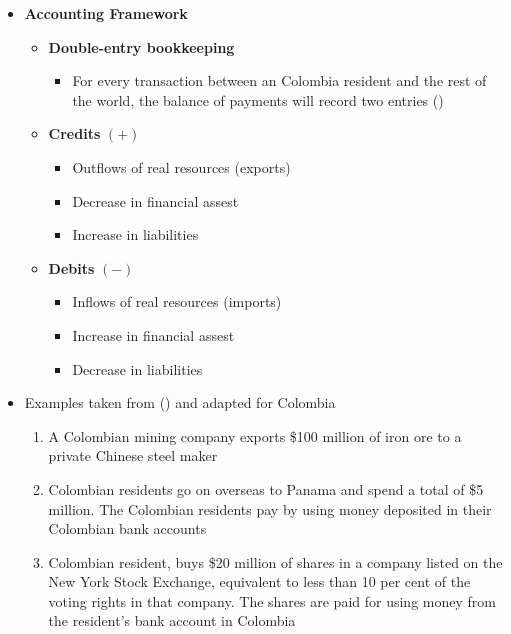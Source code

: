 \documentclass[
  ignorenonframetext,
]{beamer}
\providecommand{\tightlist}{%
  \setlength{\itemsep}{0pt}\setlength{\parskip}{0pt}}\usepackage{longtable,booktabs,array}
\begin{document}
\begin{frame}{}
\label{section-16}
\begin{itemize}
\item
  \textbf{Accounting Framework}

  \begin{itemize}
  \item
    \textbf{Double-entry bookkeeping}

    \begin{itemize}
    \tightlist
    \item
      For every transaction between an Colombia resident and the rest of
      the world, the balance of payments will record two entries
      ()
    \end{itemize}
  \item
    \textbf{Credits} \((+)\)

    \begin{itemize}
    \tightlist
    \item
      Outflows of real resources (exports)
    \item
      Decrease in financial assest
    \item
      Increase in liabilities
    \end{itemize}
  \item
    \textbf{Debits} \((-)\)

    \begin{itemize}
    \tightlist
    \item
      Inflows of real resources (imports)
    \item
      Increase in financial assest
    \item
      Decrease in liabilities
    \end{itemize}
  \end{itemize}
\end{itemize}
\end{frame}

\begin{frame}{}
\label{section-17}
\begin{itemize}
\item
  Examples taken from () and
  adapted for Colombia

  \begin{enumerate}
  \item
    A Colombian mining company exports \$100 million of iron ore to a
    private Chinese steel maker
  \item
    Colombian residents go on overseas to Panama and spend a total of
    \$5 million. The Colombian residents pay by using money deposited in
    their Colombian bank accounts
  \item
    Colombian resident, buys \$20 million of shares in a company listed
    on the New York Stock Exchange, equivalent to less than 10 per cent
    of the voting rights in that company. The shares are paid for using
    money from the resident's bank account in Colombia
  \end{enumerate}
\end{itemize}
\end{frame}
\end{document}
